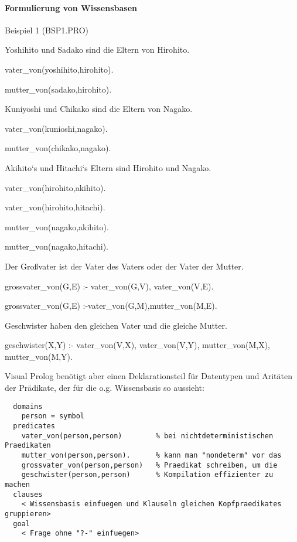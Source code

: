 \documentclass[a4paper]{article}
\begin{document}
\begin{multicols}{3}
  \paragraph{Formulierung von Wissensbasen}
  Beispiel 1 (BSP1.PRO)
  \begin{itemize*}
    \item Yoshihito und Sadako sind die Eltern von Hirohito.
    \begin{itemize*}
      \item vater\_von(yoshihito,hirohito).
      \item mutter\_von(sadako,hirohito).
    \end{itemize*}
    \item Kuniyoshi und Chikako sind die Eltern von Nagako.
    \begin{itemize*}
      \item vater\_von(kunioshi,nagako).
      \item mutter\_von(chikako,nagako).
    \end{itemize*}
    \item Akihito‘s und Hitachi‘s Eltern sind Hirohito und Nagako.
    \begin{itemize*}
      \item vater\_von(hirohito,akihito).
      \item vater\_von(hirohito,hitachi).
      \item mutter\_von(nagako,akihito).
      \item mutter\_von(nagako,hitachi).
    \end{itemize*}
    \item Der Großvater ist der Vater des Vaters oder der Vater der Mutter.
    \begin{itemize*}
      \item grossvater\_von(G,E) :- vater\_von(G,V), vater\_von(V,E).
      \item grossvater\_von(G,E) :-vater\_von(G,M),mutter\_von(M,E).
    \end{itemize*}
    \item Geschwister haben den gleichen Vater und die gleiche Mutter.
    \begin{itemize*}
      \item geschwister(X,Y) :- vater\_von(V,X), vater\_von(V,Y), mutter\_von(M,X), mutter\_von(M,Y).
    \end{itemize*}
  \end{itemize*}

  Visual Prolog benötigt aber einen Deklarationsteil für Datentypen und Aritäten der Prädikate, der für die o.g. Wissensbasis so aussieht:
  \begin{lstlisting}
  domains
    person = symbol
  predicates
    vater_von(person,person)        % bei nichtdeterministischen Praedikaten
    mutter_von(person,person).      % kann man "nondeterm" vor das
    grossvater_von(person,person)   % Praedikat schreiben, um die
    geschwister(person,person)      % Kompilation effizienter zu machen
  clauses
    < Wissensbasis einfuegen und Klauseln gleichen Kopfpraedikates gruppieren>
  goal
    < Frage ohne "?-" einfuegen>
  \end{lstlisting}


\end{multicols}
\end{document}
